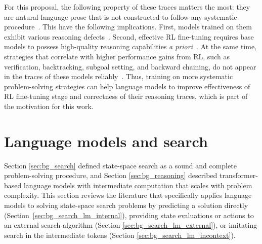 For this proposal, the following property of these traces matters the most: they are natural-language prose that is not constructed to follow any systematic procedure~\citep{guhaOpenThoughtsDataRecipes2025,lambertTulu3Pushing2025}.
This have the following implications.
First, models trained on them exhibit various reasoning defects~\citep{chenNOTThinkThat2025,wangThoughtsAreAll,pipisWaitWaitWait2026}.
Second, effective RL fine-tuning requires base models to possess high-quality reasoning capabilities \textit{a priori}~\citep{yueDoesReinforcementLearning2025}.
At the same time, strategies that correlate with higher performance gains from RL, such as verification, backtracking, subgoal setting, and backward chaining, do not appear in the traces of these models reliably~\citep{gandhiFourHabitsHighly2025}.
Thus, training on more systematic problem-solving strategies can help language models to improve effectiveness of RL fine-tuning stage and correctness of their reasoning traces, which is part of the motivation for this work.

\section{Language models and search}
\label{sec:bg_search_lm}

Section \ref{sec:bg_search} defined state-space search as a sound and complete problem-solving procedure, and Section \ref{sec:bg_reasoning} described transformer-based language models with intermediate computation that scales with problem complexity.
This section reviews the literature that specifically applies language models to solving state-space search problems by predicting a solution directly (Section~\ref{sec:bg_search_lm_internal}), providing state evaluations or actions to an external search algorithm (Section \ref{sec:bg_search_lm_external}), or imitating search in the intermediate tokens (Section \ref{sec:bg_search_lm_incontext}).

